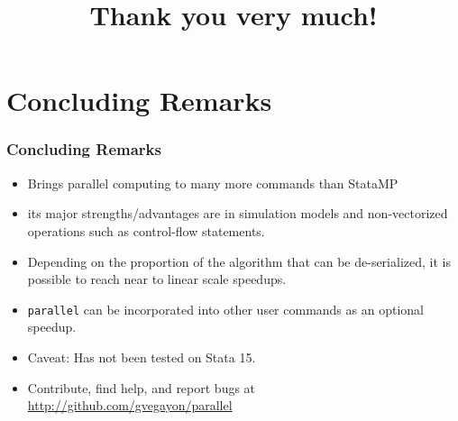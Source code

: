 \documentclass[9pt,\ExtraDocOpts]{beamer}
\begin{document}
\section{Concluding Remarks}

\begin{frame}
\frametitle{Concluding Remarks}

\begin{itemize}
\item Brings parallel computing to many more commands than StataMP \pause{}
\item its major strengths/advantages are in simulation models and non-vectorized operations such as control-flow statements.\pause{}
\item Depending on the proportion of the algorithm that can be de-serialized, it is possible to reach near to linear scale speedups.\pause{}
\item {\tt parallel} can be incorporated into other user commands as an optional speedup.  \pause{}
\item Caveat: Has not been tested on Stata 15.\pause{}
\item Contribute, find help, and report bugs at \url{http://github.com/gvegayon/parallel}\pause{}

\end{itemize}

\end{frame}

\title{Thank you very much!}

\frame{\maketitle
}
\end{document}
